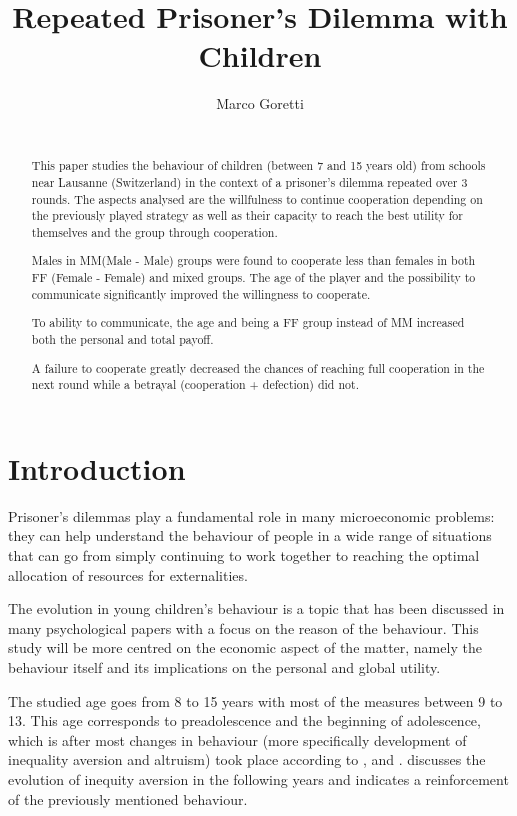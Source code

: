 \documentclass{article} %
\title{Repeated Prisoner's Dilemma with Children}
\author{
Marco Goretti \\
\texttt{} \\
}
\begin{document}
\maketitle

\begin{abstract}
This paper studies the behaviour of children (between 7 and 15 years old) from schools near Lausanne (Switzerland) in the context of a prisoner's dilemma repeated over 3 rounds. The aspects analysed are the willfulness to continue cooperation depending on the previously played strategy as well as their capacity to reach the best utility for themselves and the group through cooperation.

Males in MM(Male - Male) groups were found to cooperate less than females in both FF (Female - Female) and mixed groups. The age of the player and the possibility to communicate significantly improved the willingness to cooperate.

To ability to communicate, the age and being a FF group instead of MM increased both the personal and total payoff.

A failure to cooperate greatly decreased the chances of reaching full cooperation in the next round while a betrayal (cooperation + defection) did not.


\end{abstract}

\section{Introduction}
Prisoner's dilemmas play a fundamental role in many microeconomic problems: they can help understand the behaviour of people in a wide range of situations that can go from simply continuing to work together to reaching the optimal allocation of resources for externalities.

The evolution in young children's behaviour is a topic that has been discussed in many psychological papers with a focus on the reason of the behaviour. This study will be more centred on the economic aspect of the matter, namely the behaviour itself and its implications on the personal and global utility.

The studied age goes from 8 to 15 years with most of the measures between 9 to 13. This age corresponds to preadolescence and the beginning of adolescence, which is after most changes in behaviour (more specifically development of inequality aversion and altruism) took place according to \cite{benen}, \cite{fehr} and \cite{fehr2}. \cite{kogut} discusses the evolution of inequity aversion in the following years and indicates a reinforcement of the previously mentioned behaviour.
\end{document}
